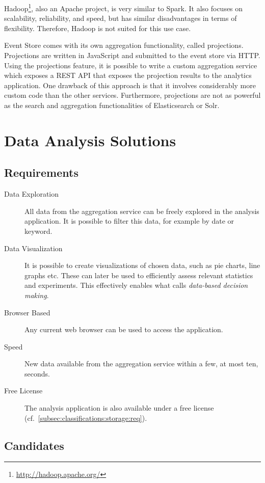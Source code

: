 Hadoop\footnote{\url{http://hadoop.apache.org/}}, also an Apache project, is very similar to Spark.
It also focuses on scalability, reliability, and speed, but has similar disadvantages in terms of flexibility.
Therefore, Hadoop is not suited for this use case.

Event Store comes with its own aggregation functionality, called projections.
Projections are written in JavaScript and submitted to the event store via HTTP.
Using the projections feature, it is possible to write a custom aggregation service which exposes a \ac{REST} API that exposes the projection results to the analytics application.
One drawback of this approach is that it involves considerably more custom code than the other services.
Furthermore, projections are not as powerful as the search and aggregation functionalities of Elasticsearch or Solr.

\section{Data Analysis Solutions}
\label{sec:classifications:analysis}

\subsection{Requirements}

\begin{description}
\item[Data Exploration] All data from the aggregation service can be freely explored in the analysis application.
It is possible to filter this data, for example by date or keyword.
\item[Data Visualization] It is possible to create visualizations of chosen data, such as pie charts, line graphs etc.
These can later be used to efficiently assess relevant statistics and experiments.
This effectively enables what \citet{Bosch2012} calls \emph{data-based decision making}.
\item[Browser Based] Any current web browser can be used to access the application.
\item[Speed] New data available from the aggregation service within a few, at most ten, seconds.
\item[Free License] The analysis application is also available under a free license (cf.~\cref{subsec:classifications:storage:req}).
\end{description}

\subsection{Candidates}

